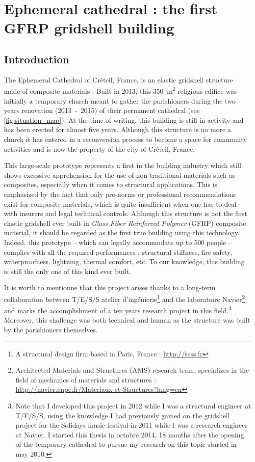 
\chapter{Ephemeral cathedral : the first GFRP gridshell building}\label{chp=creteil}

\section{Introduction}

The Ephemeral Cathedral of Créteil, France, is an elastic gridshell structure made of composite materials \cite{DuPeloux2016}. Built in 2013, this \SI{350}{m^2} religious edifice was initially a temporary church meant to gather the parishioners during the two years renovation (2013~-~2015) of their permanent cathedral (see \cref{fig:situation_map}). At the time of writing, this building is still in activity and has been erected for almost five years. Although this structure is no more a church it has entered in a reconversion process to become a space for community activities and is now the property of the city of Créteil, France.

This large-scale prototype represents a first in the building industry which still shows excessive apprehension for the use of non-traditional materials such as composites, especially when it comes to structural applications. This is emphasized by the fact that only pre-norms or professional recommendations exist for composite materials, which is quite insufficient when one has to deal with insurers and legal technical controls.
Although this structure is not the first elastic gridshell ever built in \emph{Glass Fiber Reinforced Polymer} (GFRP) composite material, it should be regarded as the first true building using this technology. Indeed, this prototype -- which can legally accommodate up to 500 people -- complies with all the required performances : structural stiffness, fire safety, waterproofness, lightning, thermal comfort, etc. To our knowledge, this building is still the only one of this kind ever built.

It is worth to mentionne that this project arises thanks to a long-term collaboration between {T/E/S/S atelier d'ingénierie}\footnote{A structural design firm based in Paris, France : \url{http://tess.fr}} and the laboratoire Navier\footnote{Architected Materials and Structures (AMS) research team, specializes in the field of mechanics of materials and structures : \url{http://navier.enpc.fr/Materiaux-et-Structures?lang=en}} and marks the accomplishment of a ten years research project in this field.\footnote{Note that I developed this project in 2012 while I was a structural engineer at T/E/S/S, using the knowledge I had previously gained on the gridshell project for the Solidays music festival in 2011 while I was a research engineer at Navier. I started this thesis in octobre 2014, 18 months after the opening of the temporary cathedral to pursue my research on this topic started in may 2010.} Moreover, this challenge was both technical and human as the structure was built by the parishioners themselves.

